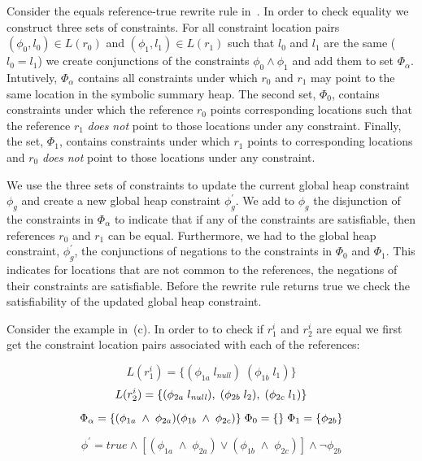 Consider the equals reference-true rewrite rule
in~. In order to check equality we construct three
sets of constraints. For all constraint location pairs $(\phi_0, l_0)
\in L(r_0)$ and $(\phi_1, l_1) \in L(r_1)$ such that $l_0$ and $l_1$
are the same ($l_0 = l_1$) we create conjunctions of the constraints
$\phi_0 \wedge \phi_1$ and add them to set $\Phi_\alpha$. Intutively,
$\Phi_\alpha$ contains all constraints under which $r_0$ and $r_1$ may
point to the same location in the symbolic summary heap. The second
set, $\Phi_0$, contains constraints under which the reference $r_0$
points corresponding locations such that the reference $r_1$
\emph{does not} point to those locations under any
constraint. Finally, the set, $\Phi_1$, contains constraints under
which $r_1$ points to corresponding locations and $r_0$ \emph{does
  not} point to those locations under any constraint.

We use the three sets of constraints to update the current global heap
constraint $\phi_g$ and create a new global heap constraint
$\phi_g^\prime$. We add to $\phi_g$ the disjunction of the constraints
in $\Phi_\alpha$ to indicate that if any of the constraints are
satisfiable, then references $r_0$ and $r_1$ can be
equal. Furthermore, we had to the global heap constraint,
$\phi_g^\prime$, the conjunctions of negations to the constraints in
$\Phi_0$ and $\Phi_1$. This indicates for locations that are not
common to the references, the negations of their constraints are
satisfiable. Before the rewrite rule returns true we check the
satisfiability of the updated global heap constraint.

Consider the example in~(c). In order to to check
if $r_1^i$ and $r_2^i$ are equal we first get the constraint location
pairs associated with each of the references:

\[
L(r_1^i) = \{ (\phi_{1a}\; l_\mathit{null})\; (\phi_{1b}\; l_1) \} 
\]
\[
L(r_2^i) = \{ (\phi_{2a}\; l_\mathit{null}),\; (\phi_{2b}\; l_2),\; (\phi_{2c}\; l_1) \} \\
\]


\[
\Phi_\alpha = \{ (\phi_{1a}\; \wedge\; \phi_{2a} ) (\phi_{1b}\; \wedge\; \phi_{2c} ) \}\;
\Phi_0 = \{ \}\; \Phi_1 = \{ \phi_{2b}\} \\
\]

\[
\phi^\prime = \mathit{true} \wedge [ (\phi_{1a}\; \wedge\; \phi_{2a} )\vee (\phi_{1b}\; \wedge\; \phi_{2c} ) ] \wedge \neg\phi_{2b} 
\]

